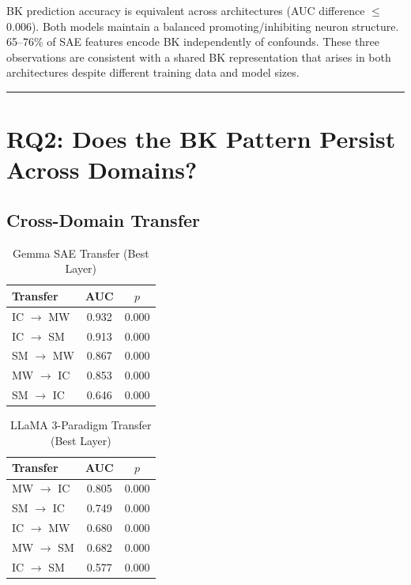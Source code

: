 \documentclass[11pt,a4paper]{article}
\begin{document}
BK prediction accuracy is equivalent across architectures (AUC difference $\leq$ 0.006). Both models maintain a balanced promoting/inhibiting neuron structure. 65--76\% of SAE features encode BK independently of confounds. These three observations are consistent with a shared BK representation that arises in both architectures despite different training data and model sizes.

\bigskip\hrule\bigskip

\section{RQ2: Does the BK Pattern Persist Across Domains?}

\subsection{Cross-Domain Transfer}

\begin{table}[H]
\centering
\caption{Gemma SAE Transfer (Best Layer)}
\begin{tabular}{lcc}
\toprule
\textbf{Transfer} & \textbf{AUC} & \textbf{$p$} \\
\midrule
IC $\rightarrow$ MW & 0.932 & 0.000 \\
IC $\rightarrow$ SM & 0.913 & 0.000 \\
SM $\rightarrow$ MW & 0.867 & 0.000 \\
MW $\rightarrow$ IC & 0.853 & 0.000 \\
SM $\rightarrow$ IC & 0.646 & 0.000 \\
\bottomrule
\end{tabular}
\end{table}

\begin{table}[H]
\centering
\caption{LLaMA 3-Paradigm Transfer (Best Layer)}
\begin{tabular}{lcc}
\toprule
\textbf{Transfer} & \textbf{AUC} & \textbf{$p$} \\
\midrule
MW $\rightarrow$ IC & 0.805 & 0.000 \\
SM $\rightarrow$ IC & 0.749 & 0.000 \\
IC $\rightarrow$ MW & 0.680 & 0.000 \\
MW $\rightarrow$ SM & 0.682 & 0.000 \\
IC $\rightarrow$ SM & 0.577 & 0.000 \\
\bottomrule
\end{tabular}
\end{table}
\end{document}
